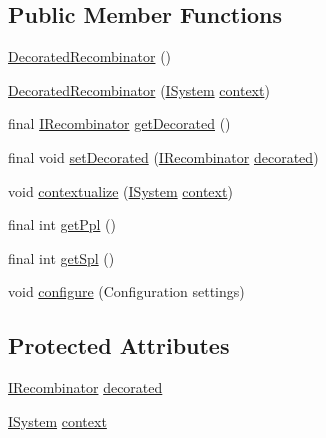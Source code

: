 \subsection*{Public Member Functions}
\begin{DoxyCompactItemize}
\item 
\hyperlink{classnet_1_1sf_1_1jclec_1_1base_1_1_decorated_recombinator_a2409eb5a636fc66ef782d49bcda12767}{Decorated\-Recombinator} ()
\item 
\hyperlink{classnet_1_1sf_1_1jclec_1_1base_1_1_decorated_recombinator_aa2fcd9e6eee89cea84c0410a7cbaf877}{Decorated\-Recombinator} (\hyperlink{interfacenet_1_1sf_1_1jclec_1_1_i_system}{I\-System} \hyperlink{classnet_1_1sf_1_1jclec_1_1base_1_1_decorated_recombinator_a9fec99558ae7ddcf3ce82d8293305786}{context})
\item 
final \hyperlink{interfacenet_1_1sf_1_1jclec_1_1_i_recombinator}{I\-Recombinator} \hyperlink{classnet_1_1sf_1_1jclec_1_1base_1_1_decorated_recombinator_a52c12c467b530190e619be015133979f}{get\-Decorated} ()
\item 
final void \hyperlink{classnet_1_1sf_1_1jclec_1_1base_1_1_decorated_recombinator_a9e8c354c25cfadcf221756dfc197d660}{set\-Decorated} (\hyperlink{interfacenet_1_1sf_1_1jclec_1_1_i_recombinator}{I\-Recombinator} \hyperlink{classnet_1_1sf_1_1jclec_1_1base_1_1_decorated_recombinator_a525eba528ff918e1be5d29d74cefb614}{decorated})
\item 
void \hyperlink{classnet_1_1sf_1_1jclec_1_1base_1_1_decorated_recombinator_a422262d71b7e49d04f11cf0d655278b2}{contextualize} (\hyperlink{interfacenet_1_1sf_1_1jclec_1_1_i_system}{I\-System} \hyperlink{classnet_1_1sf_1_1jclec_1_1base_1_1_decorated_recombinator_a9fec99558ae7ddcf3ce82d8293305786}{context})
\item 
final int \hyperlink{classnet_1_1sf_1_1jclec_1_1base_1_1_decorated_recombinator_adf1ac2852510fb9752ffc7bd01634748}{get\-Ppl} ()
\item 
final int \hyperlink{classnet_1_1sf_1_1jclec_1_1base_1_1_decorated_recombinator_a1c7ff213d34427145b5332c4df3292a9}{get\-Spl} ()
\item 
void \hyperlink{classnet_1_1sf_1_1jclec_1_1base_1_1_decorated_recombinator_acec6cc90c1f13341f8087029b588797c}{configure} (Configuration settings)
\end{DoxyCompactItemize}
\subsection*{Protected Attributes}
\begin{DoxyCompactItemize}
\item 
\hyperlink{interfacenet_1_1sf_1_1jclec_1_1_i_recombinator}{I\-Recombinator} \hyperlink{classnet_1_1sf_1_1jclec_1_1base_1_1_decorated_recombinator_a525eba528ff918e1be5d29d74cefb614}{decorated}
\item 
\hyperlink{interfacenet_1_1sf_1_1jclec_1_1_i_system}{I\-System} \hyperlink{classnet_1_1sf_1_1jclec_1_1base_1_1_decorated_recombinator_a9fec99558ae7ddcf3ce82d8293305786}{context}
\end{DoxyCompactItemize}


